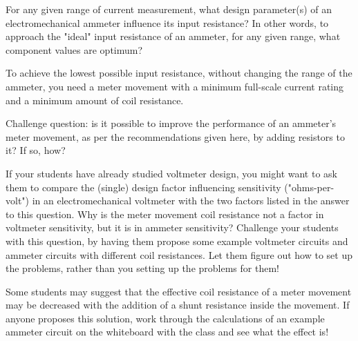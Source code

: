 

For any given range of current measurement, what design parameter(s) of an electromechanical ammeter influence its input resistance?  In other words, to approach the "ideal" input resistance of an ammeter, for any given range, what component values are optimum?







To achieve the lowest possible input resistance, without changing the range of the ammeter, you need a meter movement with a minimum full-scale current rating and a minimum amount of coil resistance.

\vskip 10pt

Challenge question: is it possible to improve the performance of an ammeter's meter movement, as per the recommendations given here, by adding resistors to it?  If so, how?







If your students have already studied voltmeter design, you might want to ask them to compare the (single) design factor influencing sensitivity ("ohms-per-volt") in an electromechanical voltmeter with the two factors listed in the answer to this question.  Why is the meter movement coil resistance not a factor in voltmeter sensitivity, but it is in ammeter sensitivity?  Challenge your students with this question, by having them propose some example voltmeter circuits and ammeter circuits with different coil resistances.  Let them figure out how to set up the problems, rather than you setting up the problems for them!

Some students may suggest that the effective coil resistance of a meter movement may be decreased with the addition of a shunt resistance inside the movement.  If anyone proposes this solution, work through the calculations of an example ammeter circuit on the whiteboard with the class and see what the effect is!




